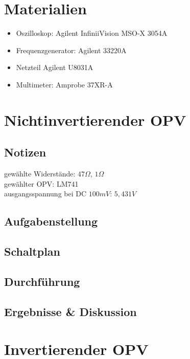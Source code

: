 \documentclass[12pt,a4paper,titlepage]{article}
\begin{document}
\setcounter{page}{2}

\newpage
\setcounter{tocdepth}{1}
\tableofcontents

\newpage

\section*{Materialien}
\begin{itemize}
	\item Oszilloskop: Agilent InfiniiVision MSO-X 3054A
	\item Frequenzgenerator: Agilent 33220A
  \item Netzteil Agilent U8031A
  \item Multimeter: Amprobe 37XR-A
\end{itemize}

\section{Nichtinvertierender OPV}

\subsection*{Notizen}
gew\"ahlte Widerst\"ande: $47\Omega$, $1\Omega$ \\
gew\"ahlter OPV: LM741 \\
ausgangsspannung bei DC $100mV$: $5,431V$ \\

\subsection*{Aufgabenstellung}

\subsection*{Schaltplan}

\subsection*{Durchf\"uhrung}

\subsection*{Ergebnisse \& Diskussion}


\section{Invertierender OPV}
\end{document}
